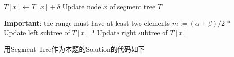 \begin{itemize}
\begin{algorithm}[H]
\begin{algorithmic}[1]
\State \Return
\EndIf
\State $T[x]\gets T[x]+\delta$ \Comment Update node $x$ of segment tree $T$
\end{algorithmic}
\end{algorithm}
\begin{algorithm}[H]
\begin{algorithmic}[1]
\If{$\alpha \neq \beta$} \Comment \textbf{Important}: the range must have at least two elements
\State $m:=(\alpha+\beta)/2$
\State $\ast$ Update left subtree of $T[x]$
\State {} 
\State $\ast$ Update right subtree of $T[x]$
\State {} 
\EndIf
\EndProcedure
\end{algorithmic}
\end{algorithm}
\end{itemize}
用Segment Tree作为本题的Solution的代码如下
